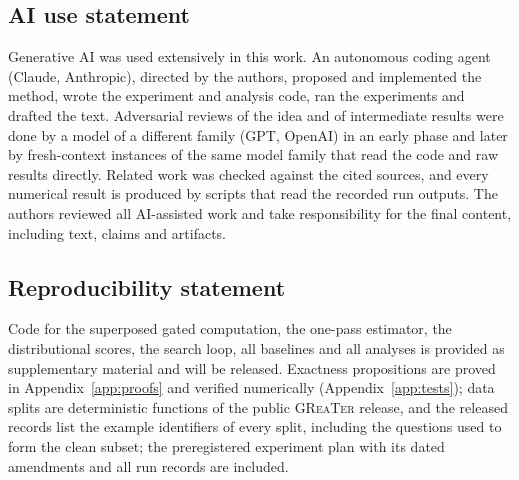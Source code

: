 \documentclass{article}
\newcommand{\greater}{\textsc{GReaTer}}
\begin{document}
\subsection*{AI use statement}
Generative AI was used extensively in this work. An autonomous coding agent (Claude, Anthropic),
directed by the authors, proposed and implemented the method, wrote the experiment and analysis
code, ran the experiments and drafted the text. Adversarial reviews of the idea and of intermediate
results were done by a model of a different family (GPT, OpenAI) in an early phase and later by
fresh-context instances of the same model family that read the code and raw results directly.
Related work was checked against the cited sources, and every numerical result is produced by
scripts that read the recorded run outputs. The authors reviewed all AI-assisted work and take
responsibility for the final content, including text, claims and artifacts.

\subsection*{Reproducibility statement}
Code for the superposed gated computation, the one-pass estimator, the distributional scores, the
search loop, all baselines and all analyses is provided as supplementary material and will be
released. Exactness propositions are proved in Appendix~\ref{app:proofs} and verified numerically
(Appendix~\ref{app:tests}); data splits are deterministic functions of the public \greater{}
release, and the released records list the example identifiers of every split, including the
questions used to form the clean subset; the preregistered experiment plan with its dated
amendments and all run records are included.




\appendix

\end{document}
